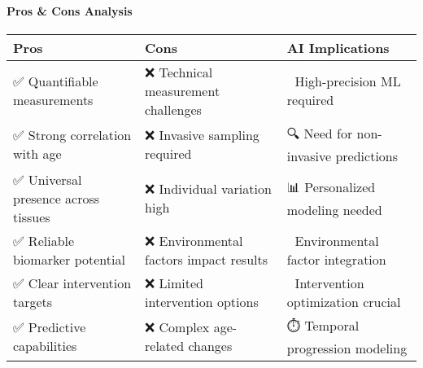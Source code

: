 \begin{Shaded}
\begin{Highlighting}[]
\end{Highlighting}
\end{Shaded}

\paragraph{Pros \& Cons Analysis}\label{pros-cons-analysis-2}

\begin{longtable}[]{@{}
  >{\raggedright\arraybackslash}p{}
  >{\raggedright\arraybackslash}p{}
  >{\raggedright\arraybackslash}p{}@{}}
\toprule\noalign{}
\begin{minipage}[b]{\linewidth}\raggedright
Pros
\end{minipage} & \begin{minipage}[b]{\linewidth}\raggedright
Cons
\end{minipage} & \begin{minipage}[b]{\linewidth}\raggedright
AI Implications
\end{minipage} \\
\midrule\noalign{}
\endhead
\bottomrule\noalign{}
\endlastfoot
✅ Quantifiable measurements & ❌ Technical measurement challenges & 🤖
High-precision ML required \\
✅ Strong correlation with age & ❌ Invasive sampling required & 🔍 Need
for non-invasive predictions \\
✅ Universal presence across tissues & ❌ Individual variation high & 📊
Personalized modeling needed \\
✅ Reliable biomarker potential & ❌ Environmental factors impact
results & 🧬 Environmental factor integration \\
✅ Clear intervention targets & ❌ Limited intervention options & 🎯
Intervention optimization crucial \\
✅ Predictive capabilities & ❌ Complex age-related changes & ⏱️
Temporal progression modeling \\
\end{longtable}

